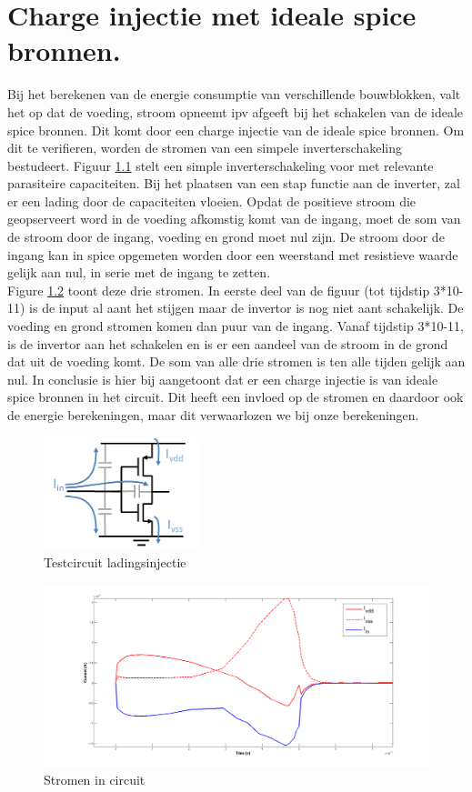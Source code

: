 \chapter{Charge injectie met ideale spice bronnen.}
\label{app:chargeinj}
Bij het berekenen van de energie consumptie van verschillende bouwblokken, valt het op dat de voeding, stroom opneemt ipv afgeeft bij het schakelen van de ideale spice bronnen. Dit komt door een charge injectie van de ideale spice bronnen. Om dit te verifieren, worden de stromen van een simpele inverterschakeling bestudeert. Figuur \ref{fig:chargeinj_inv} stelt een simple inverterschakeling voor met relevante parasiteire capaciteiten. Bij het plaatsen van een stap functie aan de inverter, zal er een lading door de capaciteiten vloeien. Opdat de positieve stroom die geopserveert word in de voeding afkomstig komt van de ingang, moet de som van de stroom door de ingang, voeding en grond moet nul zijn. De stroom door de ingang kan in spice opgemeten worden door een weerstand met resistieve waarde gelijk aan nul, in serie met de ingang te zetten.\\
Figure \ref{fig:chargeinj_cur} toont deze drie stromen. In eerste deel van de figuur (tot tijdstip 3*10-11) is de input al aant het stijgen maar de invertor is nog niet aant schakelijk. De voeding en grond stromen komen dan puur van de ingang. Vanaf tijdstip 3*10-11, is de invertor aan het schakelen en is er een aandeel van de stroom in de grond dat uit de voeding komt. De som van alle drie stromen is ten alle tijden gelijk aan nul.
In conclusie is hier bij aangetoont dat er een charge injectie is van ideale spice bronnen in het circuit. Dit heeft een invloed op de stromen en daardoor ook de energie berekeningen, maar dit verwaarlozen we bij onze berekeningen.

\begin{figure}[!ht]
  \centering
  \includegraphics[width=0.4\textwidth]{../fig/hfdst-chargeinj-inv.png}
  \caption[ladingsinjectie: testcircuit]{Testcircuit ladingsinjectie}
  \label{fig:chargeinj_inv}
\end{figure}

\begin{figure}[!ht]
  \centering
  \includegraphics[width=\textwidth]{../fig/hfdst-chargeinj-currents.png}
  \caption[ladingsinjectie: stroom]{Stromen in circuit}
  \label{fig:chargeinj_cur}
\end{figure}